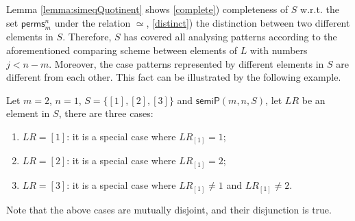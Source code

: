 \documentclass[final]{IEEEtran}
\newcommand\lyj[1]{\textcolor{magenta}{lyj: #1}}
\newcommand\caicomment[1]{\textcolor{red}{comment: #1} }
\begin{document}
{Lemma \ref{lemma:simeqQuotinent} shows \ref{complete}) completeness of $S$ w.r.t. the set $\mathsf{perms}_{m}^{n}$ under the relation $\simeq$, \ref{distinct})  the distinction between two different elements in $S$. Therefore, $S$ has covered all analysing patterns according to the aforementioned comparing scheme between elements of $L$ with numbers $j<n-m$. Moreover, the case patterns represented by different elements in $S$ are different from each other. This fact can be illustrated by the following example.
\begin{example}
Let $m=2$, $n=1$, $S=\{[1],[2],[3]\}$ and  $\mathsf{semiP}(m,n,S)$,  let $LR$ be an element in $S$, there are three cases:
\begin{enumerate}
\item $LR=[1]$: it is a special case where $LR_{[1]}=1 $;
\item $LR=[2]$: it is a special case where $LR_{[1]}=2 $;
\item $LR=[3]$: it is a special case where $LR_{[1]}\ne 1$ and $LR_{[1]}\ne 2$.
\end{enumerate}
\end{example}
Note that the above cases are mutually disjoint, and their disjunction  is true.



}
\end{document}
